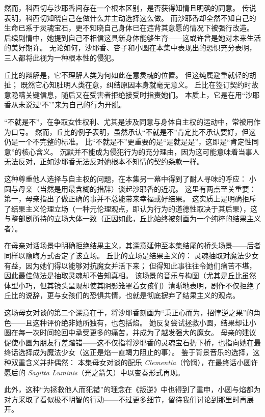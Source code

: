 然而，科西切与沙耶香间存在一个根本区别，是否获得知情且明确的同意。
传说表明，科西切知晓自己在做什么并主动选择这么做。
而沙耶香却全然不知自己的生命已系于灵魂宝石，更不知晓自己身体已在违背其意愿的情况下被强行改造。
后续剧情中，她提到自己不相信这具新身体能够生育——这或许曾是她对未来生活的美好期许。
无论如何，沙耶香、杏子和小圆在本集中表现出的恐惧充分表明，三人都将此视为一种根本性的侵犯。

丘比的辩解是，它不理解人类为何如此在意灵魂的位置。
但这纯属避重就轻的胡扯；
既然它心知肚明人类在意，纠结原因本身就毫无意义。
丘比在签订契约时故意隐瞒关键信息，随后又在受害者拒绝接受时指责她们。
本质上，它是在用“沙耶香从未说过‘不’”来为自己的行为开脱。

“不就是不”，在争取女性权利、尤其是涉及同意与身体自主权的运动中，常被用作为口号。
然而，丘比的例子表明，虽然承认“不就是不”肯定比不承认要好，但这仍是一个不完整的标准。
比“不就是不”更重要的是“是就是是”，这即是“肯定性同意”的核心含义\cite{ref37}。
沉默并不能成为侵犯行为的充分理由，因为这可能意味着当事人无法反对，正如沙耶香无法反对她根本不知情的契约条款一样。

这种尊重他人选择与自主权的问题，在本集另一幕中得到了耐人寻味的呼应：
小圆与母亲（当然是用最含糊的措辞）谈起沙耶香的近况。
这里有两点至关重要：
第一，母亲指出了做正确的事并不总能带来幸福或好结果。
这实质上是明确拒斥了结果主义伦理立场（一种元伦理观点，即认为行为的道德性取决于其后果\cite{ref38}），这与整部剧所持的立场大体一致（正因如此，丘比始终被刻画为一个纯粹的结果主义者）。

在母亲对话场景中明确拒绝结果主义，其深意延伸至本集结尾的桥头场景——后者同样以隐晦方式否定了该立场。
丘比的立场是结果主义的：
灵魂抽取对魔法少女有益，因为她们得以能够对抗魔女并活下来；
但得知此事往往令她们痛苦不堪，因此最佳做法是抽取灵魂却不告知真相。
该场景的音乐与构图（尤其是丘比虽然体型小巧，但其镜头呈现却使其阴影笼罩着女孩们）清晰地表明，剧作不仅拒绝了丘比的说辞，更与女孩们的恐惧共情，也就是彻底摒弃了结果主义的观点。

这场母女对谈的第二个深意在于，将沙耶香刻画为“秉正心而为，招悖逆之果”的角色——且这种评价绝非她所独有，也包括焰。
她反复尝试拯救小圆，结果却让小圆在每一次时间轮回中承受更多的痛苦，并成为了越发强大的魔女。
母亲的建议促使小圆为朋友行差踏错——这不仅指将沙耶香的灵魂宝石扔下桥，也指向她在最终话选择成为魔法少女（这正是焰一直竭力阻止的事）。
鉴于背景音乐的选择，这种双重含义并非偶然：
本集母女对谈的配乐 \emph{Clementia}（怜悯），在最终话小圆许愿后的 \emph{Sagitta Luminis}（光之箭矢）中以变奏形式再现。

此外，这种“为拯救他人而犯错”的理念在《叛逆》中也得到了重申，小圆与焰都为对方采取了看似极不明智的行动——不过更多细节，留待我们讨论到那里时再展开。

